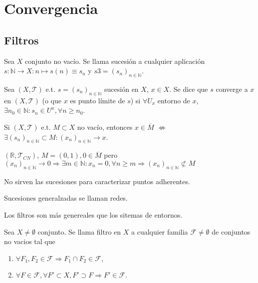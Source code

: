 \chapter{Convergencia}

\section{Filtros}

\begin{defn}[Sucesión]
  Sea $X$ conjunto no vacío. Se llama sucesión a cualquier aplicación $s : \mathbb{N} \to X : n \mapsto s(n) \equiv s_{n}$ y $s 3 = (s_{n})_{n \in \mathbb{N}}$.
\end{defn}

\begin{defn}
  Sea $( X, \mathcal{T} )$ e.t. $s = ( s_{n} )_{n \in \mathbb{N}}$ sucesión en $X$, $x \in X$. Se dice que $s$ converge a $x$ en $( X, \mathcal{T} )$ (o que $x$ es punto límite de $s$) si $\forall U_{x}$ entorno de $x$, $\exists n_{0} \in \mathbb{N} : s_{n} \in U^{x}, \forall n \geq n_{0}$. 
\end{defn}

\begin{obs}
  Si $( X, \mathcal{T} )$ e.t. $M \subset X$ no vacío, entonces $x \in \overline{M}$ $\not \Leftrightarrow$ $\exists ( s_{n} )_{n \in \mathbb{N}} \subset M : ( x_{n} )_{n \in \mathbb{N}} \rightarrow x$.
\end{obs}

\begin{ejm}
  $( \mathbb{R}, \mathcal{T}_{CN} )$, $M = ( 0, 1), 0 \in \overline{M}$ pero $( x_{n} )_{n \in \mathbb{N}} \rightarrow 0 \Rightarrow \exists m \in \mathbb{N} : x_{n} = 0, \forall n \geq m \Rightarrow ( x_{n} )_{n \in \mathbb{N}} \not \subset M$
\end{ejm}

\begin{obs}
  No sirven las sucesiones para caracterizar puntos adherentes.
\end{obs}

\begin{obs}
  Sucesiones generalzadas se llaman redes.
\end{obs}

\begin{obs}
  Los filtros son más genereales que los sitemas de entornos.
\end{obs}

\begin{defn}
  Sea $X \neq \emptyset$ conjunto. Se llama filtro en $X$ a cualquier familia $\mathcal{F} \neq \emptyset$ de conjuntos no vacios tal que
  \begin{enumerate}[label=(\roman*)]
    \item $\forall F_{1}, F_{2} \in \mathcal{F} \Rightarrow F_{1} \cap F_{2} \in \mathcal{F}$,
    \item $\forall F \in \mathcal{F}, \forall F' \subset X, F' \supset F \Rightarrow F' \in \mathcal{F}$.
  \end{enumerate}
\end{defn}

